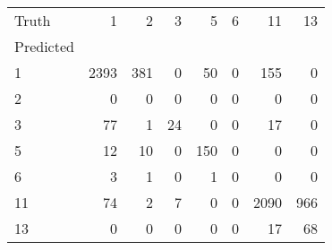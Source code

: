 \begin{tabular}{lrrrrrrr}
\toprule
Truth & 1 & 2 & 3 & 5 & 6 & 11 & 13 \\
Predicted &  &  &  &  &  &  &  \\
\midrule
1 & 2393 & 381 & 0 & 50 & 0 & 155 & 0 \\
2 & 0 & 0 & 0 & 0 & 0 & 0 & 0 \\
3 & 77 & 1 & 24 & 0 & 0 & 17 & 0 \\
5 & 12 & 10 & 0 & 150 & 0 & 0 & 0 \\
6 & 3 & 1 & 0 & 1 & 0 & 0 & 0 \\
11 & 74 & 2 & 7 & 0 & 0 & 2090 & 966 \\
13 & 0 & 0 & 0 & 0 & 0 & 17 & 68 \\
\bottomrule
\end{tabular}
